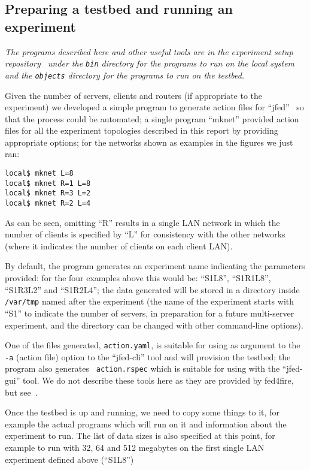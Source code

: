 \documentclass[a4paper,11pt,twocolumn]{article}
\begin{document}
\subsection{Preparing a testbed and running an experiment}

{\em The programs described here and other useful tools are in the experiment
setup repository~\cite{exp:scripts} under the {\tt bin} directory for
the programs to run on the local system and the {\tt objects} directory
for the programs to run on the testbed.}

Given the number of servers, clients and routers (if appropriate to the
experiment) we developed a simple program to generate action files
for ``jfed''~\cite{jfed} so that the process could be automated; a single program
``mknet'' provided action files for all the experiment topologies
described in this report by providing appropriate options; for the
networks shown as examples in the figures we just ran:

\begin{small}
\begin{verbatim}
local$ mknet L=8
local$ mknet R=1 L=8
local$ mknet R=3 L=2
local$ mknet R=2 L=4
\end{verbatim}
\end{small}

As can be seen, omitting ``R'' results in a single LAN network in which
the number of clients is specified by ``L'' for consistency with the
other networks (where it indicates the number of clients on each client
LAN).

By default, the program generates an experiment name indicating the
parameters provided: for the four examples above this would be: ``S1L8'',
``S1R1L8'', ``S1R3L2'' and ``S1R2L4''; the data generated will be stored
in a directory inside {\tt/var/tmp} named after the experiment (the name
of the experiment starts with ``S1'' to indicate the number of servers,
in preparation for a future multi-server experiment, and the directory
can be changed with other command-line options).

One of the files generated, {\tt action.yaml}, is suitable for using
as argument to the {\tt-a} (action file) option to the ``jfed-cli''
tool and will provision the testbed; the program also generates {\tt
action.rspec} which is suitable for using with the ``jfed-gui'' tool.
We do not describe these tools here as they are provided by fed4fire,
but see~\cite{jfed}.

Once the testbed is up and running, we need to copy some things to it,
for example the actual programs which will run on it and information about
the experiment to run.  The list of data sizes is also specified at
this point, for example to run with 32, 64 and 512 megabytes on the
first single LAN experiment defined above (``S1L8'')
\end{document}
